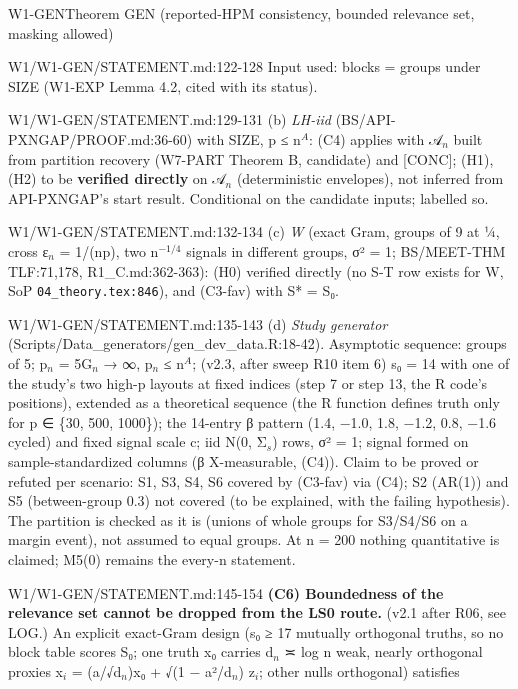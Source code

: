 \begin{card}{W1-GEN}{Theorem GEN (reported-HPM consistency, bounded relevance set, masking allowed)}
\begin{stmt}{W1/W1-GEN/STATEMENT.md:122-128}
Input used: blocks = groups under SIZE (W1-EXP Lemma 4.2, cited with its status).
\end{stmt}
\begin{stmt}{W1/W1-GEN/STATEMENT.md:129-131}
(b) \emph{LH-iid} (BS/API-PXNGAP/PROOF.md:36-60) with SIZE, p ≤ n$^{A}$: (C4) applies with 𝒜$_{n}$ built from partition recovery
(W7-PART Theorem B, candidate) and [CONC]; (H1), (H2) to be \textbf{verified directly} on 𝒜$_{n}$ (deterministic envelopes),
not inferred from API-PXNGAP's start result. Conditional on the candidate inputs; labelled so.
\end{stmt}
\begin{stmt}{W1/W1-GEN/STATEMENT.md:132-134}
(c) \emph{W} (exact Gram, groups of 9 at ¼, cross ε$_{n}$ = 1/(np), two n$^{-1/4}$ signals in different groups, σ² = 1; BS/MEET-THM
TLF:71,178, R1\_C.md:362-363): (H0) verified directly (no S-T row exists for W, SoP \texttt{04\_theory.tex:846}), and
(C3-fav) with S* = S₀.
\end{stmt}
\begin{stmt}{W1/W1-GEN/STATEMENT.md:135-143}
(d) \emph{Study generator} (Scripts/Data\_generators/gen\_dev\_data.R:18-42). Asymptotic sequence: groups of 5; p$_{n}$ = 5G$_{n}$ → ∞,
p$_{n}$ ≤ n$^{A}$; (v2.3, after sweep R10 item 6) s₀ = 14 with one of the study's two high-p layouts at fixed indices (step 7
or step 13, the R code's positions), extended as a theoretical sequence (the R function defines truth only for
p ∈ \{30, 500, 1000\}); the 14-entry β pattern (1.4, −1.0, 1.8, −1.2, 0.8, −1.6 cycled) and fixed signal scale c; iid N(0, Σ$_{s}$) rows,
σ² = 1; signal formed on sample-standardized columns (β X-measurable, (C4)). Claim to be proved or refuted per
scenario: S1, S3, S4, S6 covered by (C3-fav) via (C4); S2 (AR(1)) and S5 (between-group 0.3) not covered (to be
explained, with the failing hypothesis). The partition is checked as it is (unions of whole groups for S3/S4/S6 on a
margin event), not assumed to equal groups. At n = 200 nothing quantitative is claimed; M5(0) remains the every-n
statement.
\end{stmt}
\begin{stmt}{W1/W1-GEN/STATEMENT.md:145-154}
\textbf{(C6) Boundedness of the relevance set cannot be dropped from the LS0 route.} (v2.1 after R06, see LOG.) An
explicit exact-Gram design (s₀ ≥ 17 mutually orthogonal truths, so no block table scores S₀; one truth x₀ carries
d$_{n}$ ≍ log n weak, nearly orthogonal proxies x$_{i}$ = (a/√d$_{n}$)x₀ + √(1 − a²/d$_{n}$) z$_{i}$; other nulls orthogonal) satisfies

\end{stmt}
\end{card}
